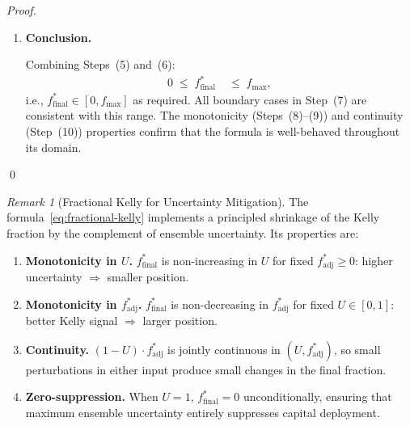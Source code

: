 \documentclass[12pt,openany]{book}
\numberwithin{equation}{chapter}
\theoremstyle{plain}
\theoremstyle{definition}
\theoremstyle{remark}
\newtheorem{remark}[theorem]{Remark}
\numberwithin{equation}{chapter}
\theoremstyle{plain}
\begin{document}
\begin{proof}
\begin{enumerate}
  \item[\textup{(11)}] \textbf{Conclusion.}

        Combining Steps~(5) and~(6):
        \begin{align}
          0
          \;\leq\; f^*_{\mathrm{final}}
          &\;\leq\; f_{\max},
          \label{eq:ffinal-range}
        \end{align}
        i.e., $f^*_{\mathrm{final}} \in [0, f_{\max}]$ as
        required.  All boundary cases in Step~(7) are
        consistent with this range.  The monotonicity
        (Steps~(8)--(9)) and continuity (Step~(10))
        properties confirm that the formula is well-behaved
        throughout its domain.

\end{enumerate}
\qed
\end{proof}

\begin{remark}[Fractional Kelly for Uncertainty Mitigation]
\label{rem:fractional-kelly}
The formula~\eqref{eq:fractional-kelly} implements a principled
shrinkage of the Kelly fraction by the complement of ensemble
uncertainty.  Its properties are:
\begin{enumerate}
  \item[\textup{(i)}] \textbf{Monotonicity in $U$.}
        $f^*_{\mathrm{final}}$ is non-increasing in $U$
        for fixed $f^*_{\mathrm{adj}} \geq 0$:
        higher uncertainty $\Rightarrow$ smaller position.
  \item[\textup{(ii)}] \textbf{Monotonicity in
        $f^*_{\mathrm{adj}}$.}
        $f^*_{\mathrm{final}}$ is non-decreasing in
        $f^*_{\mathrm{adj}}$ for fixed $U \in [0,1]$:
        better Kelly signal $\Rightarrow$ larger position.
  \item[\textup{(iii)}] \textbf{Continuity.}
        $(1-U)\cdot f^*_{\mathrm{adj}}$ is jointly
        continuous in $(U, f^*_{\mathrm{adj}})$, so
        small perturbations in either input produce small
        changes in the final fraction.
  \item[\textup{(iv)}] \textbf{Zero-suppression.}
        When $U = 1$, $f^*_{\mathrm{final}} = 0$
        unconditionally, ensuring that maximum ensemble
        uncertainty entirely suppresses capital deployment.
\end{enumerate}
\end{remark}

\end{document}
